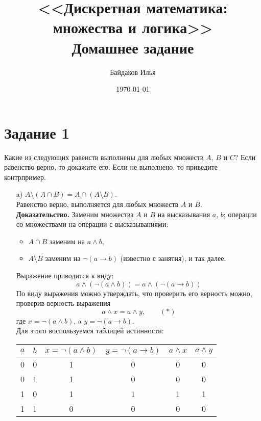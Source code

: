 \documentclass[a4paper,12pt]{article}
\begin{document}
\title{<<Дискретная математика: \\ множества и логика>> \\ \vspace{12pt} Домашнее задание}
\author{Байдаков Илья}
\date{\today}
\maketitle


\section*{Задание 1}
Какие из следующих равенств выполнены для любых множеств $A$, $B$ и $C$?
Если равенство верно, то докажите его. Если не выполнено, то приведите контрпример.
\begin{itemize}
\item[a)]
$A\setminus (A\cap B)= A \cap(A \setminus B)$.\\
Равенство верно, выполняется для любых множеств $A$ и $B$. \\
{\bf Доказательство.} Заменим множества $A$ и $B$ на высказывания $a$, $b$; операции со множествами на операции с высказываниями:
\begin{itemize}
 \item $A\cap B$ заменим на $a \wedge b$,
 \item $A\setminus B$ заменим на $\neg (a \rightarrow b)$ (известно с занятия), и так далее. 
 \end{itemize}
Выражение приводится к виду: \\
$$a \wedge (\neg (a \wedge b)) = a \wedge (\neg (a \rightarrow b))$$
По виду выражения можно утверждать, что проверить его верность можно, проверив верность выражения \\
$$a \wedge x = a \wedge y	, \qquad (*)$$
где $x = \neg (a \wedge b)$, a $y = \neg (a \rightarrow b)$. \\

Для этого воспользуемся таблицей истинности: \\
\nopagebreak

\begin{tabular}{|c|c|c|c|c|c|}
\hline
$a$ &$b$ & $x = \neg (a \wedge b)$ & $y = \neg (a \rightarrow b)$ & $a\wedge x$ &  $a\wedge y$ \\
\hline
0&0&1&0&0&0 \\
\hline
0&1&1&0&0&0 \\
\hline
1&0&1&1&1&1 \\
\hline
1&1&0&0&0&0 \\
\hline
\end{tabular}\\


\end{itemize}
\end{document}
